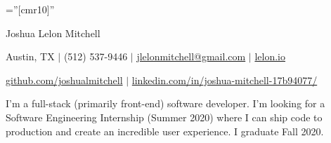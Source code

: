 \documentclass[a4paper,10pt]{article}
\begin{document}

\pagestyle{empty} %

\font\fb=''[cmr10]'' %

\par{\centering
		{\Huge Joshua Lelon Mitchell
	}\par}
\par{\centering
		{
	Austin, TX
	$\mid$
	(512) 537-9446
	$\mid$
	\href {mailto:jlelonmitchell@gmail.com}{jlelonmitchell@gmail.com}
	$\mid$
	\href {https://lelon.io/}{lelon.io}
}\par}
\par{\centering
		{
	\href {https://github.com/joshualmitchell}{github.com/joshualmitchell}
	$\mid$
	\href {https://www.linkedin.com/in/joshua-mitchell-17b94077/}{linkedin.com/in/joshua-mitchell-17b94077/}
}\par}

\begin{center}
I'm a full-stack (primarily front-end) software developer. I'm looking for a Software Engineering Internship (Summer 2020) where I can ship code to production and create an incredible user experience. I graduate Fall 2020. \end{center}

\end{document}
